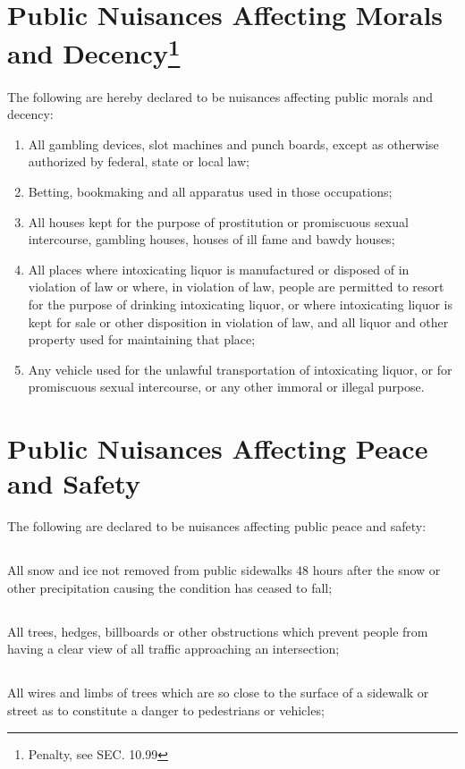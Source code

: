 \section{Public Nuisances Affecting Morals and Decency\footnote{Penalty, see SEC. 10.99}}
The following are hereby declared to be nuisances affecting public morals and decency:
\begin{enumerate}[{\indent}A)]
    \item All gambling devices, slot machines and punch boards, except as otherwise authorized by federal, state or local law;
    \item Betting, bookmaking and all apparatus used in those occupations;
    \item All houses kept for the purpose of prostitution or promiscuous sexual intercourse, gambling houses, houses of ill fame and bawdy houses;
    \item All places where intoxicating liquor is manufactured or disposed of in violation of law or where, in violation of law, people are permitted to resort for the purpose of drinking intoxicating liquor, or where intoxicating liquor is kept for sale or other disposition in violation of law, and all liquor and other property used for maintaining that place;
    \item Any vehicle used for the unlawful transportation of intoxicating liquor, or for promiscuous sexual intercourse, or any other immoral or illegal purpose.
\end{enumerate}
\section{Public Nuisances Affecting Peace and Safety}
The following are declared to be nuisances affecting public peace and safety:
\subsection{}
All snow and ice not removed from public sidewalks 48 hours after the snow or other precipitation causing the condition has ceased to fall;
\subsection{}
All trees, hedges, billboards or other obstructions which prevent people from having a clear view of all traffic approaching an intersection;
\subsection{}
All wires and limbs of trees which are so close to the surface of a sidewalk or street as to constitute a danger to pedestrians or vehicles;
